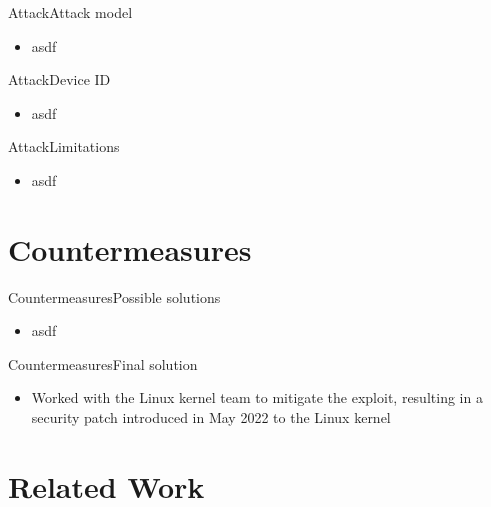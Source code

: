 \documentclass[a4paper]{article}
\begin{document}
\begin{frame}[fragile]{Attack}{Attack model}
  \begin{itemize}
    \item asdf
  \end{itemize}
\end{frame}

\begin{frame}[fragile]{Attack}{Device ID}
  \begin{itemize}
    \item asdf
  \end{itemize}
\end{frame}

\begin{frame}[fragile]{Attack}{Limitations}
  \begin{itemize}
    \item asdf
  \end{itemize}
\end{frame}

\section{Countermeasures}

\begin{frame}[fragile]{Countermeasures}{Possible solutions}
	\begin{itemize}
		\item asdf
	\end{itemize}
\end{frame}

\begin{frame}[fragile]{Countermeasures}{Final solution}
	\begin{itemize}
		\item Worked with the Linux kernel team to mitigate the exploit, resulting in a security patch introduced in May 2022 to the Linux kernel
	\end{itemize}
\end{frame}

\section{Related Work}
\end{document}
